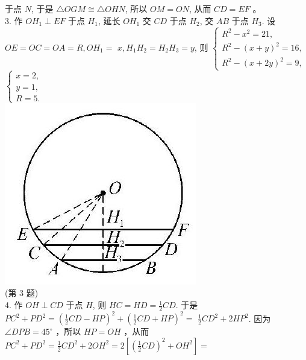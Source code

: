\documentclass[10pt]{article}
\begin{document}
于点 $N$, 于是 $\triangle O G M \cong \triangle O H N$, 所以 $O M=O N$, 从而 $C D=E F$ 。\\
3. 作 $O H_{1} \perp E F$ 于点 $H_{1}$, 延长 $O H_{1}$ 交 $C D$ 于点 $H_{2}$, 交 $A B$ 于点 $H_{3}$. 设 $O E=O C=O A=R, O H_{1}=$ $x, H_{1} H_{2}=H_{2} H_{3}=y$, 则 $\left\{\begin{array}{l}R^{2}-x^{2}=21, \\ R^{2}-(x+y)^{2}=16, \\ R^{2}-(x+2 y)^{2}=9,\end{array}\right.$ $\left\{\begin{array}{l}x=2, \\ y=1, \\ R=5 .\end{array}\right.$\\
\includegraphics[max width=\textwidth, center]{2024_10_30_66b8e5e701da2093c133g-087(2)}\\
(第 3 题)\\
4. 作 $O H \perp C D$ 于点 $H$, 则 $H C=H D=\frac{1}{2} C D$. 于是 $P C^{2}+P D^{2}=\left(\frac{1}{2} C D-H P\right)^{2}+\left(\frac{1}{2} C D+H P\right)^{2}=$ $\frac{1}{2} C D^{2}+2 H P^{2}$. 因为 $\angle D P B=45^{\circ}$ ，所以 $H P=O H$ ，从而 $P C^{2}+P D^{2}=\frac{1}{2} C D^{2}+2 O H^{2}=2\left[\left(\frac{1}{2} C D\right)^{2}+O H^{2}\right]=$\\
\end{document}
